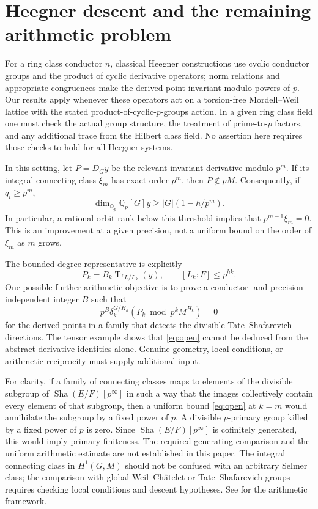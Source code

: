 \documentclass[11pt,a4paper]{article}
\theoremstyle{definition}
\theoremstyle{remark}
\newcommand{\Sha}{\operatorname{Sha}}
\newcommand{\Qp}{\mathbb Q_p}
\newcommand{\Tr}{\operatorname{Tr}}
\begin{document}
\section{Heegner descent and the remaining arithmetic problem}
For a ring class conductor $n$, classical Heegner constructions use cyclic conductor groups and the product of cyclic derivative operators; norm relations and appropriate congruences make the derived point invariant modulo powers of $p$. Our results apply whenever these operators act on a torsion-free Mordell--Weil lattice with the stated product-of-cyclic-$p$-groups action. In a given ring class field one must check the actual group structure, the treatment of prime-to-$p$ factors, and any additional trace from the Hilbert class field. No assertion here requires those checks to hold for all Heegner systems.

In this setting, let $P=D_Gy$ be the relevant invariant derivative modulo $p^m$. If its integral connecting class $\xi_m$ has exact order $p^m$, then $P\notin pM$. Consequently, if $q_i\ge p^m$,
\begin{equation}\label{eq:heegner}
 \dim_{\Qp}\Qp[G]y\ge |G|(1-h/p^m).
\end{equation}
In particular, a rational orbit rank below this threshold implies that $p^{m-1}\xi_m=0$. This is an improvement at a given precision, not a uniform bound on the order of $\xi_m$ as $m$ grows.

The bounded-degree representative is explicitly
\[
 P_k=B_k\Tr_{L/L_k}(y),\qquad [L_k:F]\le p^{hk}.
\]
One possible further arithmetic objective is to prove a conductor- and precision-independent integer $B$ such that
\begin{equation}\label{eq:open}
 p^B\delta_k^{G/H_k}(P_k\bmod p^kM^{H_k})=0
\end{equation}
for the derived points in a family that detects the divisible Tate--Shafarevich directions. The tensor example shows that \eqref{eq:open} cannot be deduced from the abstract derivative identities alone. Genuine geometry, local conditions, or arithmetic reciprocity must supply additional input.

For clarity, if a family of connecting classes maps to elements of the divisible subgroup of $\Sha(E/F)[p^\infty]$ in such a way that the images collectively contain every element of that subgroup, then a uniform bound \eqref{eq:open} at $k=m$ would annihilate the subgroup by a fixed power of $p$. A divisible $p$-primary group killed by a fixed power of $p$ is zero. Since $\Sha(E/F)[p^\infty]$ is cofinitely generated, this would imply primary finiteness. The required generating comparison and the uniform arithmetic estimate are not established in this paper. The integral connecting class in $H^1(G,M)$ should not be confused with an arbitrary Selmer class; the comparison with global Weil--Ch\^atelet or Tate--Shafarevich groups requires checking local conditions and descent hypotheses. See \cite{howard,kim} for the arithmetic framework.
\end{document}
